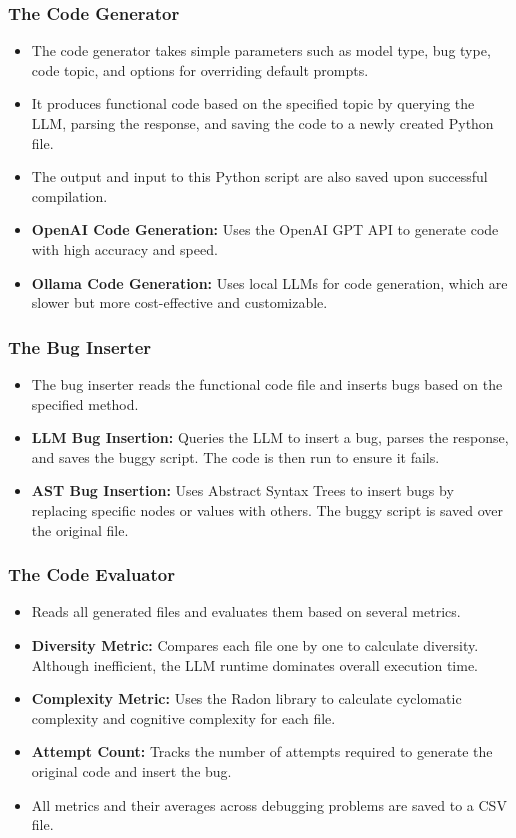 \documentclass[12pt]{extarticle}
\begin{document}
\subsubsection{The Code Generator}
\begin{itemize}
    \item The code generator takes simple parameters such as model type, bug type, code topic, and options for overriding default prompts.
    \item It produces functional code based on the specified topic by querying the LLM, parsing the response, and saving the code to a newly created Python file.
    \item The output and input to this Python script are also saved upon successful compilation.
    \item \textbf{OpenAI Code Generation:} Uses the OpenAI GPT API to generate code with high accuracy and speed.
    \item \textbf{Ollama Code Generation:} Uses local LLMs for code generation, which are slower but more cost-effective and customizable.
\end{itemize}

\subsubsection{The Bug Inserter}
\begin{itemize}
    \item The bug inserter reads the functional code file and inserts bugs based on the specified method.
    \item \textbf{LLM Bug Insertion:} Queries the LLM to insert a bug, parses the response, and saves the buggy script. The code is then run to ensure it fails.
    \item \textbf{AST Bug Insertion:} Uses Abstract Syntax Trees to insert bugs by replacing specific nodes or values with others. The buggy script is saved over the original file.
\end{itemize}

\subsubsection{The Code Evaluator}
\begin{itemize}
    \item Reads all generated files and evaluates them based on several metrics.
    \item \textbf{Diversity Metric:} Compares each file one by one to calculate diversity. Although inefficient, the LLM runtime dominates overall execution time.
    \item \textbf{Complexity Metric:} Uses the Radon library to calculate cyclomatic complexity and cognitive complexity for each file.
    \item \textbf{Attempt Count:} Tracks the number of attempts required to generate the original code and insert the bug.
    \item All metrics and their averages across debugging problems are saved to a CSV file.
\end{itemize}
\end{document}
